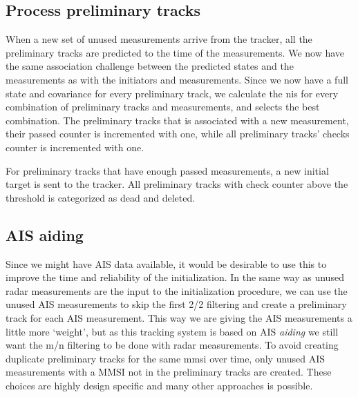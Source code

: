 \subsection{Process preliminary tracks}
When a new set of unused measurements arrive from the tracker, all the preliminary tracks are predicted to the time of the measurements. We now have the same association challenge between the predicted states and the measurements as with the initiators and measurements. Since we now have a full state and covariance for every preliminary track, we calculate the \gls{nis} for every combination of preliminary tracks and measurements, and selects the best combination. The preliminary tracks that is associated with a new measurement, their passed counter is incremented with one, while all preliminary tracks' checks counter is incremented with one. 

For preliminary tracks that have enough passed measurements, a new initial target is sent to the tracker. All preliminary tracks with check counter above the threshold is categorized as dead and deleted. 

\subsection{AIS aiding}
Since we might have AIS data available, it would be desirable to use this to improve the time and reliability of the initialization. In the same way as unused radar measurements are the input to the initialization procedure, we can use the unused AIS measurements to skip the first 2/2 filtering and create a preliminary track for each AIS measurement. This way we are giving the AIS measurements a little more `weight', but as this tracking system is based on AIS \emph{aiding} we still want the m/n filtering to be done with radar measurements. To avoid creating duplicate preliminary tracks for the same \gls{mmsi} over time, only unused AIS measurements with a MMSI not in the preliminary tracks are created. These choices are highly design specific and many other approaches is possible. 


